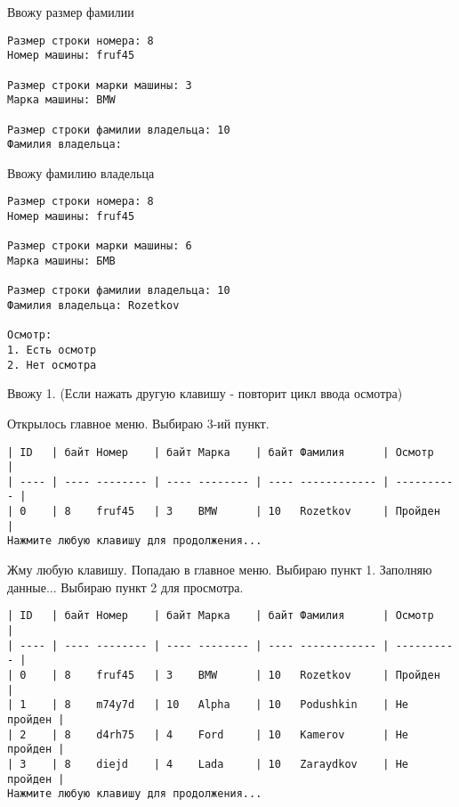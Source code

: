 Ввожу размер фамилии

\begin{tcolorbox}
\begin{verbatim}
Размер строки номера: 8
Номер машины: fruf45

Размер строки марки машины: 3
Марка машины: BMW

Размер строки фамилии владельца: 10
Фамилия владельца:
\end{verbatim}
\end{tcolorbox}

Ввожу фамилию владельца

\begin{tcolorbox}
\begin{verbatim}
Размер строки номера: 8
Номер машины: fruf45

Размер строки марки машины: 6
Марка машины: БМВ

Размер строки фамилии владельца: 10
Фамилия владельца: Rozetkov

Осмотр:       
1. Есть осмотр
2. Нет осмотра
\end{verbatim}
\end{tcolorbox}

Ввожу 1. (Если нажать другую клавишу - повторит цикл ввода осмотра)

Открылось главное меню. Выбираю 3-ий пункт.

\begin{tcolorbox}
\begin{verbatim}
| ID   | байт Номер    | байт Марка    | байт Фамилия      | Осмотр     |
| ---- | ---- -------- | ---- -------- | ---- ------------ | ---------- |
| 0    | 8    fruf45   | 3    BMW      | 10   Rozetkov     | Пройден    |
Нажмите любую клавишу для продолжения...
\end{verbatim}
\end{tcolorbox}

Жму любую клавишу. Попадаю в главное меню. Выбираю пункт 1. Заполняю данные... Выбираю пункт 2 для просмотра.

\begin{tcolorbox}
\begin{verbatim}
| ID   | байт Номер    | байт Марка    | байт Фамилия      | Осмотр     |
| ---- | ---- -------- | ---- -------- | ---- ------------ | ---------- |
| 0    | 8    fruf45   | 3    BMW      | 10   Rozetkov     | Пройден    |
| 1    | 8    m74y7d   | 10   Alpha    | 10   Podushkin    | Не пройден |
| 2    | 8    d4rh75   | 4    Ford     | 10   Kamerov      | Не пройден |
| 3    | 8    diejd    | 4    Lada     | 10   Zaraydkov    | Не пройден |
Нажмите любую клавишу для продолжения...
\end{verbatim}
\end{tcolorbox}

